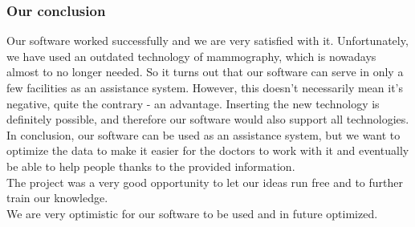 \subsubsection{Our conclusion}

 Our software worked successfully and we are very satisfied with it. Unfortunately, we have used an outdated technology of mammography, which is nowadays almost to no longer needed. So it turns out that our software can serve in only a few facilities as an assistance system. However, this doesn't necessarily mean it's negative, quite the contrary - an advantage. Inserting the new technology is definitely possible, and therefore our software would also support all technologies.\\
In conclusion, our software can be used as an assistance system, but we want to optimize the data to make it easier for the doctors to work with it and eventually be able to help people thanks to the provided information. \\
The project was a very good opportunity to let our ideas run free and to further train our knowledge.  \\
We are very optimistic for our software to be used and in future optimized.\\
